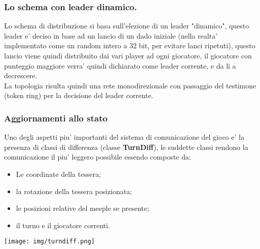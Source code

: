 \subsubsection{Lo schema con leader dinamico.}
Lo schema di distribuzione si basa sull'elezione di un leader "dinamico", questo
leader e' deciso in base ad un lancio di un dado iniziale (nella realta'
implementato come un random intero a 32 bit, per evitare lanci ripetuti), questo
lancio viene quindi distribuito dai vari player ad ogni giocatore, 
il giocatore con punteggio maggiore verra' quindi
dichiarato come leader corrente, e da li a decrescere.\\
La topologia risulta quindi una rete monodirezionale con passaggio del
testimone (token ring) per la decisione del leader corrente.


\subsubsection{Aggiornamenti allo stato}
	Uno degli aspetti piu' importanti del sistema di comunicazione del gioco
	e' la presenza di classi di differenza (classe \textbf{TurnDiff}), le
	suddette classi rendono la comunicazione il piu' leggero possibile
	essendo composte da:\\

\begin{minipage}{.60\textwidth}
	\begin{itemize}
		\item Le coordinate della tessera;
		\item la rotazione della tessera posizionata;
		\item le posizioni relative del meeple se presente;
		\item il turno e il giocatore correnti.
	\end{itemize}
\end{minipage}
\begin{minipage}{.20\textwidth}
	\texttt{[image: img/turndiff.png]}
\end{minipage}

